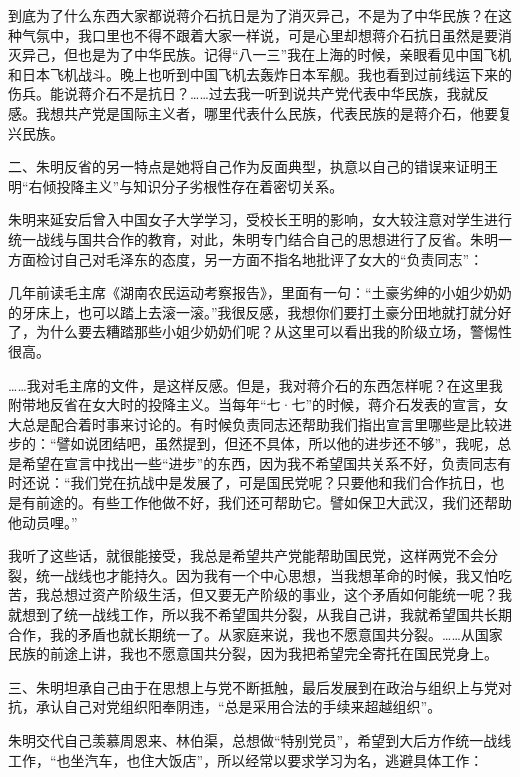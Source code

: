 \begin{quoting}
到底为了什么东西大家都说蒋介石抗日是为了消灭异己，不是为了中华民族？在这种气氛中，我口里也不得不跟着大家一样说，可是心里却想蒋介石抗日虽然是要消灭异己，但也是为了中华民族。记得“八一三”我在上海的时候，亲眼看见中国飞机和日本飞机战斗。晚上也听到中国飞机去轰炸日本军舰。我也看到过前线运下来的伤兵。能说蒋介石不是抗日？……过去我一听到说共产党代表中华民族，我就反感。我想共产党是国际主义者，哪里代表什么民族，代表民族的是蒋介石，他要复兴民族。
\end{quoting}

二、朱明反省的另一特点是她将自己作为反面典型，执意以自己的错误来证明王明“右倾投降主义”与知识分子劣根性存在着密切关系。

朱明来延安后曾入中国女子大学学习，受校长王明的影响，女大较注意对学生进行统一战线与国共合作的教育，对此，朱明专门结合自己的思想进行了反省。朱明一方面检讨自己对毛泽东的态度，另一方面不指名地批评了女大的“负责同志”：

\begin{quoting}
几年前读毛主席《湖南农民运动考察报告》，里面有一句：“土豪劣绅的小姐少奶奶的牙床上，也可以踏上去滚一滚。”我很反感，我想你们要打土豪分田地就打就分好了，为什么要去糟踏那些小姐少奶奶们呢？从这里可以看出我的阶级立场，警惕性很高。

……我对毛主席的文件，是这样反感。但是，我对蒋介石的东西怎样呢？在这里我附带地反省在女大时的投降主义。当每年“七·七”的时候，蒋介石发表的宣言，女大总是配合着时事来讨论的。有时候负责同志还帮助我们指出宣言里哪些是比较进步的：“譬如说团结吧，虽然提到，但还不具体，所以他的进步还不够”，我呢，总是希望在宣言中找出一些“进步”的东西，因为我不希望国共关系不好，负责同志有时还说：“我们党在抗战中是发展了，可是国民党呢？只要他和我们合作抗日，也是有前途的。有些工作他做不好，我们还可帮助它。譬如保卫大武汉，我们还帮助他动员哩。”

我听了这些话，就很能接受，我总是希望共产党能帮助国民党，这样两党不会分裂，统一战线也才能持久。因为我有一个中心思想，当我想革命的时候，我又怕吃苦，我总想过资产阶级生活，但又要无产阶级的事业，这个矛盾如何能统一呢？我就想到了统一战线工作，所以我不希望国共分裂，从我自己讲，我就希望国共长期合作，我的矛盾也就长期统一了。从家庭来说，我也不愿意国共分裂。……从国家民族的前途上讲，我也不愿意国共分裂，因为我把希望完全寄托在国民党身上。
\end{quoting}

三、朱明坦承自己由于在思想上与党不断抵触，最后发展到在政治与组织上与党对抗，承认自己对党组织阳奉阴违，“总是采用合法的手续来超越组织”。

朱明交代自己羡慕周恩来、林伯渠，总想做“特别党员”，希望到大后方作统一战线工作，“也坐汽车，也住大饭店”，所以经常以要求学习为名，逃避具体工作：

